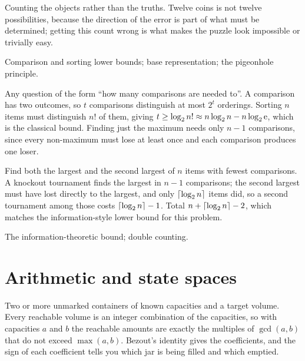 \begin{trap}
Counting the objects rather than the truths. Twelve coins is not twelve possibilities, because the direction of the error is part of what must be determined; getting this count wrong is what makes the puzzle look impossible or trivially easy.
\end{trap}

\begin{seealsob}Comparison and sorting lower bounds; base representation; the pigeonhole principle.\end{seealsob}

\cue Any question of the form ``how many comparisons are needed to''.
\method A comparison has two outcomes, so $t$ comparisons distinguish at most $2^{t}$ orderings. Sorting $n$ items must distinguish $n!$ of them, giving $t\geq\log_{2}n!\approx n\log_{2}n-n\log_{2}\mathrm{e}$, which is the classical bound. Finding just the maximum needs only $n-1$ comparisons, since every non-maximum must lose at least once and each comparison produces one loser.

\begin{worked}
Find both the largest and the second largest of $n$ items with fewest comparisons. A knockout tournament finds the largest in $n-1$ comparisons; the second largest must have lost directly to the largest, and only $\left\lceil \log_{2}n\right\rceil$ items did, so a second tournament among those costs $\left\lceil \log_{2}n\right\rceil-1$. Total $n+\left\lceil \log_{2}n\right\rceil-2$, which matches the information-style lower bound for this problem.
\end{worked}

\begin{seealsob}The information-theoretic bound; double counting.\end{seealsob}

\section{Arithmetic and state spaces}

\cue Two or more unmarked containers of known capacities and a target volume.
\method Every reachable volume is an integer combination of the capacities, so with capacities $a$ and $b$ the reachable amounts are exactly the multiples of $\gcd(a,b)$ that do not exceed $\max(a,b)$. Bezout's identity gives the coefficients, and the sign of each coefficient tells you which jar is being filled and which emptied.

